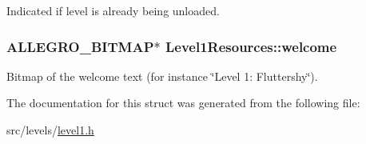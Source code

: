 Indicated if level is already being unloaded. \hypertarget{structLevel1Resources_acbc46643b03108212b8a975a1fac5f03}{
\subsubsection[{welcome}]{\setlength{\rightskip}{0pt plus 5cm}A\+L\+L\+E\+G\+R\+O\+\_\+\+B\+I\+T\+M\+A\+P$\ast$ Level1\+Resources\+::welcome}}\label{structLevel1Resources_acbc46643b03108212b8a975a1fac5f03}
Bitmap of the welcome text (for instance \char`\"{}\+Level 1\+: Fluttershy\char`\"{}). 

The documentation for this struct was generated from the following file\+:\begin{DoxyCompactItemize}
\item 
src/levels/\hyperlink{level1_8h}{level1.\+h}\end{DoxyCompactItemize}
